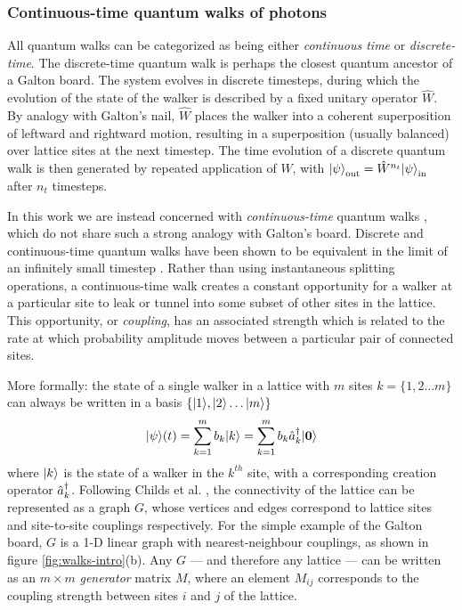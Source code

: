 \subsubsection{Continuous-time quantum walks of photons}
All quantum walks can be categorized as being either \emph{continuous time} or \emph{discrete-time}. 
The discrete-time quantum walk \cite{Aharonov2000, Nayak2000, Watrous1998} is perhaps the closest quantum ancestor of a Galton board. The system evolves in discrete timesteps, during which the evolution of the state of the walker is described by a fixed unitary operator $\hat{W}$. By analogy with Galton's nail, $\hat{W}$ places the walker into a coherent superposition of leftward and rightward motion, resulting in a superposition (usually balanced) over lattice sites at the next timestep. The time evolution of a discrete quantum walk is then generated by repeated application of $\hat{W}$, with $\mbox{$ | \psi \rangle $}_{\mathrm{out}}=\hat{W}^{n_t}\mbox{$ | \psi \rangle $}_{\mathrm{in}}$ after $n_t$ timesteps.  

In this work we are instead concerned with \emph{continuous-time} quantum walks \cite{Childs2001a, Farhi1998a}, which do not share such a strong analogy with Galton's board. Discrete and continuous-time quantum walks have been shown to be equivalent in the limit of an infinitely small timestep \cite{Childs2010}. 
Rather than using instantaneous splitting operations, a continuous-time walk creates a constant opportunity for a walker at a particular site to leak or tunnel into some subset of other sites in the lattice. This opportunity, or \emph{coupling}, has an associated strength which is related to the rate at which probability amplitude moves between a particular pair of connected sites.  

More formally: the state of a single walker in a lattice with $m$ sites $k=\{1,2\ldots m\}$ can always be written in a basis $\{ \mbox{$ | 1 \rangle $}, \mbox{$ | 2 \rangle $} \ldots \mbox{$ | m \rangle $}\}$
\begin{equation}
    \mbox{$ | \psi \rangle $}(t) = \sum_{k=1}^m b_k \mbox{$ | k \rangle $} = \sum_{k=1}^m b_k \hat{a}^{\dagger}_k \mbox{$ | \mathbf{0} \rangle $}
    \label{eqn:walk-superposition-state}
\end{equation}
where $\mbox{$ | k \rangle $}$ is the state of a walker in the $k^{th}$ site, with a corresponding creation operator $\hat{a}^{\dagger}_k$. 
Following Childs et al. \cite{Childs2001a}, the connectivity of the lattice can be represented as a graph $G$, whose vertices and edges correspond to lattice sites and site-to-site couplings respectively. 
For the simple example of the Galton board, $G$ is a 1-D linear graph with nearest-neighbour couplings, as shown in figure \ref{fig:walks-intro}(b).
Any $G$ --- and therefore any lattice --- can be written as an $m \times m$ \emph{generator} matrix $M$,  
where an element $M_{ij}$ corresponds to the coupling strength between sites $i$ and $j$ of the lattice.

